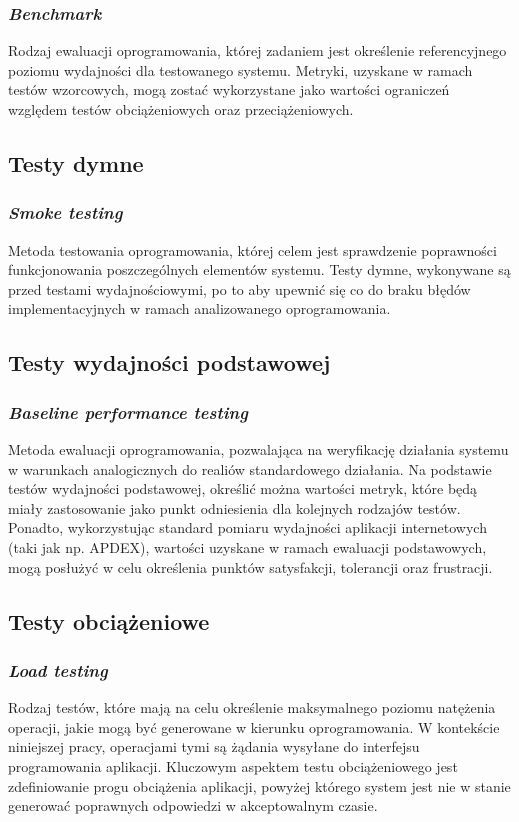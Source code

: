 \subsubsection{\textit{Benchmark}}
Rodzaj ewaluacji oprogramowania, której zadaniem jest określenie referencyjnego poziomu wydajności dla testowanego systemu. Metryki, uzyskane w ramach testów wzorcowych, mogą zostać wykorzystane jako wartości ograniczeń względem testów obciążeniowych oraz przeciążeniowych. 

\subsection*{Testy dymne}
\subsubsection{\textit{Smoke testing}}
Metoda testowania oprogramowania, której celem jest sprawdzenie poprawności funkcjonowania poszczególnych elementów systemu. Testy dymne, wykonywane są przed testami wydajnościowymi, po to aby upewnić się co do braku błędów implementacyjnych w ramach analizowanego oprogramowania.

\subsection*{Testy wydajności podstawowej}
\subsubsection{\textit{Baseline performance testing}}
Metoda ewaluacji oprogramowania, pozwalająca na weryfikację działania systemu w warunkach analogicznych do realiów standardowego działania. Na podstawie testów wydajności podstawowej, określić można wartości metryk, które będą miały zastosowanie jako punkt odniesienia dla kolejnych rodzajów testów. Ponadto, wykorzystując standard pomiaru wydajności aplikacji internetowych (taki jak np. APDEX), wartości uzyskane w ramach ewaluacji podstawowych, mogą posłużyć w celu określenia punktów satysfakcji, tolerancji oraz frustracji.

\subsection*{Testy obciążeniowe}
\subsubsection{\textit{Load testing}}
Rodzaj testów, które mają na celu określenie maksymalnego poziomu natężenia operacji, jakie mogą być generowane w kierunku oprogramowania. W kontekście niniejszej pracy, operacjami tymi są żądania wysyłane do interfejsu programowania aplikacji. Kluczowym aspektem testu obciążeniowego jest zdefiniowanie progu obciążenia aplikacji, powyżej którego system jest nie w stanie generować poprawnych odpowiedzi w akceptowalnym czasie.

